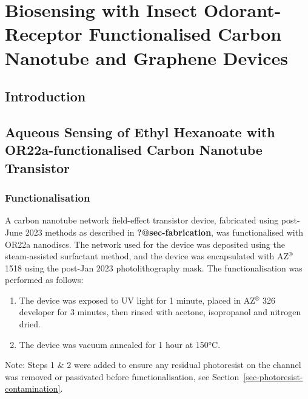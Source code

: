 \documentclass[
  a4paper,
]{scrbook}
\begin{document}
\hypertarget{biosensing-with-insect-odorant-receptor-functionalised-carbon-nanotube-and-graphene-devices}{%
\chapter{Biosensing with Insect Odorant-Receptor Functionalised Carbon
Nanotube and Graphene
Devices}\label{biosensing-with-insect-odorant-receptor-functionalised-carbon-nanotube-and-graphene-devices}}

\hypertarget{introduction-2}{%
\section{Introduction}\label{introduction-2}}

\hypertarget{aqueous-sensing-of-ethyl-hexanoate-with-or22a-functionalised-carbon-nanotube-transistor}{%
\section{Aqueous Sensing of Ethyl Hexanoate with OR22a-functionalised
Carbon Nanotube
Transistor}\label{aqueous-sensing-of-ethyl-hexanoate-with-or22a-functionalised-carbon-nanotube-transistor}}

\hypertarget{functionalisation}{%
\subsection{Functionalisation}\label{functionalisation}}

A carbon nanotube network field-effect transistor device, fabricated
using post-June 2023 methods as described in \textbf{?@sec-fabrication},
was functionalised with OR22a nanodiscs. The network used for the device
was deposited using the steam-assisted surfactant method, and the device
was encapsulated with AZ\(^\circledR\) 1518 using the post-Jan 2023
photolithography mask. The functionalisation was performed as follows:

\begin{enumerate}
\def\labelenumi{\arabic{enumi}.}
\item
  The device was exposed to UV light for 1 minute, placed in
  AZ\(^\circledR\) 326 developer for 3 minutes, then rinsed with
  acetone, isopropanol and nitrogen dried.
\item
  The device was vacuum annealed for 1 hour at 150°C.
\end{enumerate}

Note: Steps 1 \& 2 were added to ensure any residual photoresist on the
channel was removed or passivated before functionalisation, see
Section~\ref{sec-photoresist-contamination}.
\end{document}

